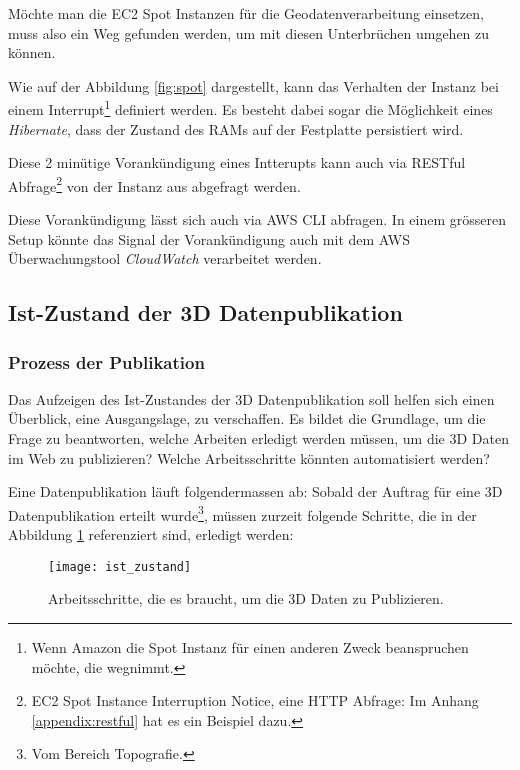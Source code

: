 Möchte man die EC2 Spot Instanzen für die Geodatenverarbeitung einsetzen, muss also ein Weg gefunden werden, um mit diesen Unterbrüchen umgehen zu können.

Wie auf der Abbildung \ref{fig:spot} dargestellt, kann das Verhalten der Instanz bei einem Interrupt\footnote{Wenn Amazon die Spot Instanz für einen anderen Zweck beanspruchen möchte, die wegnimmt.} definiert werden. Es besteht dabei sogar die Möglichkeit eines \emph{Hibernate}, dass der Zustand des RAMs auf der Festplatte persistiert wird.

Diese 2 minütige Vorankündigung eines Intterupts kann auch via RESTful Abfrage\footnote{EC2 Spot Instance Interruption Notice, eine HTTP Abfrage: Im Anhang \ref{appendix:restful} hat es ein Beispiel dazu.} von der Instanz aus abgefragt werden.

Diese Vorankündigung lässt sich auch via AWS CLI abfragen. In einem grösseren Setup könnte das Signal der Vorankündigung auch mit dem AWS Überwachungstool \emph{CloudWatch} verarbeitet werden.


\subsection{Ist-Zustand der 3D Datenpublikation}
\subsubsection{Prozess der Publikation}
Das Aufzeigen des Ist-Zustandes der 3D Datenpublikation soll helfen sich einen Überblick, eine Ausgangslage, zu verschaffen. Es bildet die Grundlage, um die Frage zu beantworten, welche Arbeiten erledigt werden müssen, um die 3D Daten im Web zu publizieren? Welche Arbeitsschritte könnten automatisiert werden? 

Eine Datenpublikation läuft folgendermassen ab: Sobald der Auftrag für eine 3D Datenpublikation erteilt wurde\footnote{Vom Bereich Topografie.}, müssen zurzeit folgende Schritte, die in der Abbildung \ref{fig:ist_zustand} referenziert sind, erledigt werden:

\begin{figure}[H]
	\centering
	\texttt{[image: ist\_zustand]}
	\caption{Arbeitsschritte, die es braucht, um die 3D Daten zu Publizieren.}
	\label{fig:ist_zustand}
\end{figure}

